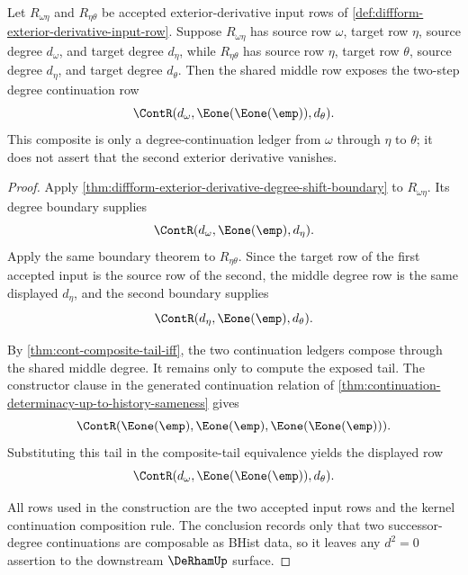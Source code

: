 \begin{theorem}
\label{thm:diffform-exterior-derivative-two-step-continuation-ledger}
Let $R_{\omega\eta}$ and $R_{\eta\theta}$ be accepted exterior-derivative input
rows of \autoref{def:diffform-exterior-derivative-input-row}. Suppose
$R_{\omega\eta}$ has source row $\omega$, target row $\eta$, source degree
$d_\omega$, and target degree $d_\eta$, while $R_{\eta\theta}$ has source row
$\eta$, target row $\theta$, source degree $d_\eta$, and target degree
$d_\theta$. Then the shared middle row exposes the two-step degree continuation
row
$$
\ContR(d_\omega,\Eone(\Eone(\emp)),d_\theta).
$$
This composite is only a degree-continuation ledger from $\omega$ through
$\eta$ to $\theta$; it does not assert that the second exterior derivative
vanishes.
\end{theorem}
\begin{proof}
Apply \autoref{thm:diffform-exterior-derivative-degree-shift-boundary} to
$R_{\omega\eta}$. Its degree boundary supplies
$$
\ContR(d_\omega,\Eone(\emp),d_\eta).
$$
Apply the same boundary theorem to $R_{\eta\theta}$. Since the target row of the
first accepted input is the source row of the second, the middle degree row is
the same displayed $d_\eta$, and the second boundary supplies
$$
\ContR(d_\eta,\Eone(\emp),d_\theta).
$$

By \autoref{thm:cont-composite-tail-iff}, the two continuation ledgers compose
through the shared middle degree. It remains only to compute the exposed tail.
The constructor clause in the generated continuation relation of
\autoref{thm:continuation-determinacy-up-to-history-sameness} gives
$$
\ContR(\Eone(\emp),\Eone(\emp),\Eone(\Eone(\emp))).
$$
Substituting this tail in the composite-tail equivalence yields the displayed
row
$$
\ContR(d_\omega,\Eone(\Eone(\emp)),d_\theta).
$$

All rows used in the construction are the two accepted input rows and the
kernel continuation composition rule. The conclusion records only that two
successor-degree continuations are composable as BHist data, so it leaves any
$d^2=0$ assertion to the downstream $\DeRhamUp$ surface.
\end{proof}
